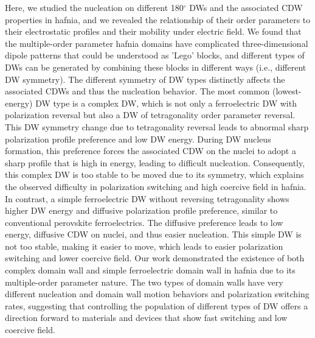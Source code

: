 \documentclass[12pt]{article}
\begin{document}
Here, we studied the nucleation on different 180$^\circ$ DWs and the associated CDW properties in hafnia, and we revealed the relationship of their order parameters to their electrostatic profiles and their mobility under electric field.
We found that the multiple-order parameter hafnia domains have complicated three-dimensional dipole patterns that could be understood as 'Lego' blocks, and different types of DWs can be generated by combining these blocks in different ways (i.e., different DW symmetry).  
The different symmetry of DW types distinctly affects the associated CDWs and thus the nucleation behavior.
The most common (lowest-energy) DW type is a complex DW, which is not only a ferroelectric DW with polarization reversal but also a DW of tetragonality order parameter reversal.
This DW symmetry change due to tetragonality reversal leads to abnormal sharp polarization profile preference and low DW energy. 
During DW nucleus formation, this preference forces the associated CDW on the nuclei to adopt a sharp profile that is high in energy, leading to difficult nucleation.
Consequently, this complex DW is too stable to be moved due to its symmetry, which explains the observed difficulty in polarization switching and high coercive field in hafnia.
In contrast, a simple ferroelectric DW without reversing tetragonality shows higher DW energy and diffusive polarization profile preference, similar to conventional perovskite ferroelectrics.
The diffusive preference leads to low energy, diffusive CDW on nuclei, and thus easier nucleation.
This simple DW is not too stable, making it easier to move, which leads to easier polarization switching and lower coercive field.
Our work demonstrated the existence of both complex domain wall and simple ferroelectric domain wall in hafnia due to its multiple-order parameter nature. The two types of domain walls have very different nucleation and domain wall motion behaviors and polarization switching rates, suggesting that controlling the population of different types of DW offers a direction forward to materials and devices that show fast switching and low coercive field.
\end{document}
